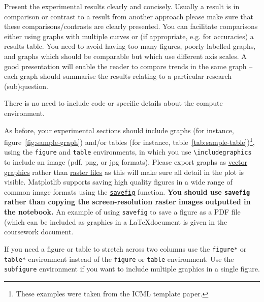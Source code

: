 \documentclass{article}
\begin{document}
Present the experimental results clearly and concisely.  Usually a result is in comparison or contrast to a result from another approach please make sure that these comparisons/contrasts are clearly presented.  You can facilitate comparisons either using graphs with multiple curves or (if appropriate, e.g. for accuracies) a results table. You need to avoid having too many figures, poorly labelled graphs, and graphs which should be comparable but which use different axis scales. A good presentation will enable the reader to compare trends in the same graph -- each graph should summarise the results relating to a particular research (sub)question.

There is no need to include code or specific details about the compute environment.

As before, your experimental sections should include graphs (for instance, figure~\ref{fig:sample-graph}) and/or tables (for instance, table~\ref{tab:sample-table})\footnote{These examples were taken from the ICML template paper.}, using the \verb+figure+ and \verb+table+ environments, in which you use \verb+\includegraphics+ to include an image (pdf, png, or jpg formats).  Please export graphs as 
\href{https://en.wikipedia.org/wiki/Vector_graphics}{vector graphics}
rather than \href{https://en.wikipedia.org/wiki/Raster_graphics}{raster
files} as this will make sure all detail in the plot is visible.
Matplotlib supports saving high quality figures in a wide range of
common image formats using the
\href{http://matplotlib.org/api/pyplot_api.html\#matplotlib.pyplot.savefig}{\texttt{savefig}}
function. \textbf{You should use \texttt{savefig} rather than copying
the screen-resolution raster images outputted in the notebook.} An
example of using \texttt{savefig} to save a figure as a PDF file (which
can be included as graphics in a \LaTeX document is given in the coursework document.

If you need a figure or table to stretch across two columns use the \verb+figure*+ or \verb+table*+ environment instead of the \verb+figure+ or \verb+table+ environment.  Use the \verb+subfigure+ environment if you want to include multiple graphics in a single figure.
\end{document}
